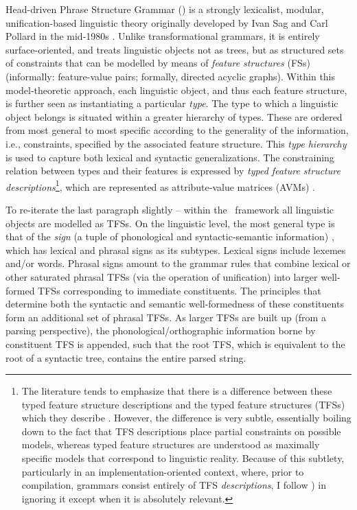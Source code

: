 Head-driven Phrase Structure Grammar (\hpsg) is a strongly lexicalist, modular,
unification-based linguistic theory originally developed by Ivan Sag and Carl
Pollard in the mid-1980s \citep{pollard1994head}. Unlike transformational
grammars, it is entirely surface-oriented, and treats linguistic objects not as
trees, but as structured sets of constraints that can be modelled by means of
\emph{feature structures} (FSs) (informally: feature-value pairs; formally,
directed acyclic graphs). Within this model-theoretic approach, each linguistic
object, and thus each feature structure, is further seen as instantiating a
particular \emph{type}. The type to which a linguistic object belongs is
situated within a greater hierarchy of types. These are ordered from most
general to most specific according to the generality of the information, i.e.,
constraints, specified by the associated feature structure. This \emph{type
hierarchy} is used to capture both lexical and syntactic generalizations. The
constraining relation between types and their features is expressed by
\emph{typed feature structure descriptions}\footnote{The literature tends to
emphasize that there is a difference between these typed feature structure
descriptions and the typed feature structures (TFSs) which they describe
\citep{copestake2002implementing}. However, the difference is very subtle,
essentially boiling down to the fact that TFS descriptions place partial
constraints on possible models, whereas typed feature structures are understood
as maximally specific models that correspond to linguistic reality. Because of
this subtlety, particularly in an implementation-oriented context, where, prior
to compilation, grammars consist entirely of TFS \emph{descriptions}, I follow
\citet{copestake2002implementing}) in ignoring it except when it is absolutely
relevant.}, which are represented as attribute-value matrices (AVMs)
\citep{sag1999syntactic}.

To re-iterate the last paragraph slightly -- within the \hpsg\, framework all
linguistic objects are modelled as TFSs. On the linguistic level, the most
general type is that of the \emph{sign} (a tuple of phonological and
syntactic-semantic information) \citep{fokkens2014enhancing}, which has lexical
and phrasal signs as its subtypes. Lexical signs include lexemes and/or words.
Phrasal signs amount to the grammar rules that combine lexical or other
saturated phrasal TFSs (via the operation of unification) into larger
well-formed TFSs corresponding to immediate constituents. The principles that
determine both the syntactic and semantic well-formedness of these constituents
form an additional set of phrasal TFSs. As larger TFSs are built up (from a
parsing perspective), the phonological/orthographic information borne by
constituent TFS is appended, such that the root TFS, which is equivalent to the
root of a syntactic tree, contains the entire parsed string.

